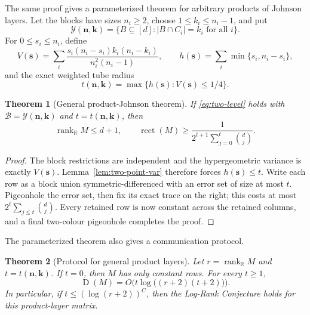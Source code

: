 \documentclass[11pt]{article}
\newtheorem{theorem}{Theorem}[section]
\theoremstyle{definition}
\theoremstyle{remark}
\newcommand{\cB}{\mathcal B}
\newcommand{\cY}{\mathcal Y}
\newcommand{\R}{\mathbb R}
\newcommand{\1}{\mathbf 1}
\newcommand{\rank}{\operatorname{rank}}
\newcommand{\rect}{\operatorname{rect}}
\newcommand{\Dcc}{\operatorname{D}}
\begin{document}
The same proof gives a parameterized theorem for arbitrary products of
Johnson layers.  Let the blocks have sizes $n_i\ge2$, choose
$1\le k_i\le n_i-1$, and put
\[
 \cY(\mathbf n,\mathbf k)
 =\{B\subseteq[d]:|B\cap C_i|=k_i\text{ for all }i\}.
\]
For $0\le s_i\le n_i$, define
\[
 V(\mathbf s)=
 \sum_i
 \frac{s_i(n_i-s_i)k_i(n_i-k_i)}{n_i^2(n_i-1)},
 \qquad
 h(\mathbf s)=\sum_i\min\{s_i,n_i-s_i\},
\]
and the exact weighted tube radius
\begin{equation}\label{eq:product-tube}
 t(\mathbf n,\mathbf k)
 =\max\{h(\mathbf s):V(\mathbf s)\le1/4\}.
\end{equation}

\begin{theorem}[General product-Johnson theorem]
\label{thm:general-product}
If \eqref{eq:two-level} holds with
$\cB=\cY(\mathbf n,\mathbf k)$ and
$t=t(\mathbf n,\mathbf k)$, then
\[
 \rank_{\R}M\le d+1,
 \qquad
 \rect(M)\ge
 \frac1{2^{t+1}\sum_{j=0}^t\binom dj}.
\]
\end{theorem}

\begin{proof}
The block restrictions are independent and the hypergeometric variance is
exactly $V(\mathbf s)$.  Lemma~\ref{lem:two-point-var} therefore forces
$h(\mathbf s)\le t$.  Write each row as a block union symmetric-differenced
with an error set of size at most $t$.  Pigeonhole the error set, then fix its
exact trace on the right; this costs at most
$2^t\sum_{j\le t}\binom dj$.  Every retained row is now constant across the
retained columns, and a final two-colour pigeonhole completes the proof.
\end{proof}

The parameterized theorem also gives a communication protocol.

\begin{theorem}[Protocol for general product layers]
\label{thm:general-product-protocol}
Let $r=\rank_{\R}M$ and $t=t(\mathbf n,\mathbf k)$.  If $t=0$, then $M$ has
only constant rows.  For every $t\ge1$,
\[
 \Dcc(M)=O\bigl(t\log\bigl((r+2)(t+2)\bigr)\bigr).
\]
In particular, if $t\le(\log(r+2))^C$, then the Log-Rank Conjecture holds for
this product-layer matrix.
\end{theorem}
\end{document}
